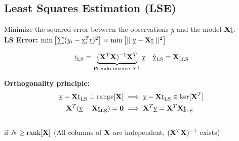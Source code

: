 \begin{mdframed}[style=eqbox]
  \subsection{Least Squares Estimation (LSE)}
  Minimize the squared error between the observations $\underbar{y}$ and the model $\mathbf{X} \underbar{t}$.\\[0.25em]
  \textbf{LS Error:} $\min \left[\sum (y_i - \underbar{x}_i^T \underbar{t})^2\right] = \min \left[\mid\mid \underbar{y} - \mathbf{X} \underbar{t} \mid\mid^2\right]$
  \begin{mdframed}[style=redbox]
    \vspace*{-10pt}
    \begin{align*}
      \underbar{t}_{\text{LS}} = \underbrace{(\mathbf{X}^T \mathbf{X})^{-1} \mathbf{X}^T}_{\text{Pseudo inverse~} X^+} \underbar{y} && \hat{\underbar{y}}_{\text{LS}} = \mathbf{X} \underbar{t}_{\text{LS}}
    \end{align*}
  \end{mdframed}
  \textbf{Orthogonality principle:}
  \vspace*{-4pt}
  \begin{align*}
    \underbar{y} - \mathbf{X}\underbar{t}_{\text{LS}} \perp \text{range}[\mathbf{X}] &\implies \underbar{y} - \mathbf{X}\underbar{t}_{\text{LS}} \in \text{ker}[\mathbf{X}^T]\\
    \mathbf{X}^T(\underbar{y} - \mathbf{X}\underbar{t}_{\text{LS}}) = \mathbf{0} &\implies \mathbf{X}^T \underbar{y} = \mathbf{X}^T \mathbf{X} \underbar{t}_{\text{LS}}\\
  \end{align*}\vspace*{-24pt}\\
  \small{if $N \geq \text{rank}[\mathbf{X}]$ (All columns of $\mathbf{X}$ are independent, $(\mathbf{X}^T \mathbf{X})^{-1}$ exists)}
\end{mdframed}

